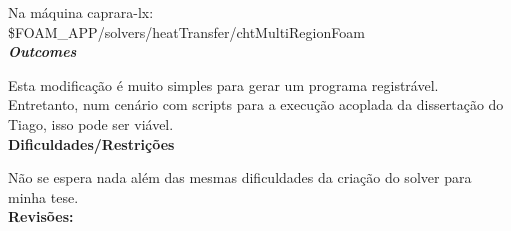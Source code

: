 Na máquina caprara-lx: \$FOAM\_APP/solvers/heatTransfer/chtMultiRegionFoam\\

\textbf{\textit{Outcomes}}

Esta modificação é muito simples para gerar um programa registrável. Entretanto, 
num cenário com scripts para a execução acoplada da dissertação do Tiago, isso 
pode ser viável.\\

\textbf{Dificuldades/Restrições}

Não se espera nada além das mesmas dificuldades da criação do solver para minha 
tese. \\

\textbf{Revisões:}

\date{21 de novembro de 2018}
